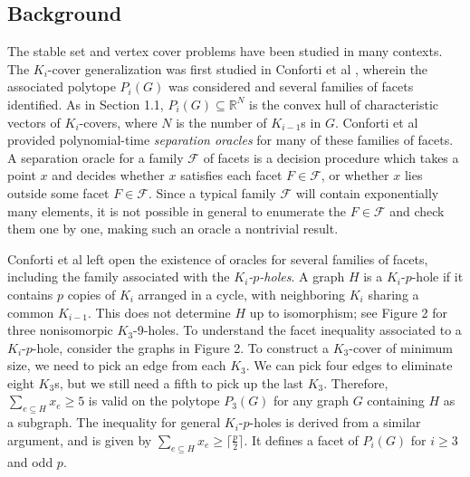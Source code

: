 \subsection{Background}

The stable set and vertex cover problems have been studied in many contexts. 
The $K_i$-cover generalization was first studied in Conforti et al \cite{conforti}, wherein the associated polytope $P_i(G)$ was considered and several families of facets identified. 
As in Section 1.1, $P_i(G) \subseteq \mathbb{R}^N$ is the convex hull of characteristic vectors of $K_i$-covers, where $N$ is the number of $K_{i-1}$s in $G$. 
Conforti et al provided polynomial-time {\em separation oracles} for many of these families of facets. 
A separation oracle for a family $\mathcal{F}$ of facets is a decision procedure which takes a point $x$ and decides whether $x$ satisfies each facet $F \in \mathcal{F}$, or whether $x$ lies outside some facet $F \in \mathcal{F}$.
Since a typical family $\mathcal{F}$ will contain exponentially many elements, it is not possible in general to enumerate the $F \in \mathcal{F}$ and check them one by one, making such an oracle a nontrivial result.

Conforti et al left open the existence of oracles for several families of facets, including the family associated with the {\em $K_i$-$p$-holes}. 
A graph $H$ is a $K_i$-$p$-hole if it contains $p$ copies of $K_i$ arranged in a cycle, with neighboring $K_i$ sharing a common $K_{i-1}$. 
This does not determine $H$ up to isomorphism; see Figure 2 for three nonisomorpic $K_3$-9-holes.
To understand the facet inequality associated to a $K_i$-$p$-hole, consider the graphs in Figure 2. 
To construct a $K_3$-cover of minimum size, we need to pick an edge from each $K_3$. 
We can pick four edges to eliminate eight $K_3$s, but we still need a fifth to pick up the last $K_3$. 
Therefore, $\sum_{e \subseteq H} x_e \ge 5$ is valid on the polytope $P_3(G)$ for any graph $G$ containing $H$ as a subgraph. 
The inequality for general $K_i$-$p$-holes is derived from a similar argument, and is given by $\sum_{e \subseteq H} x_e \ge \lceil \frac{p}{2} \rceil$.
It defines a facet of $P_i(G)$ for $i \ge 3$ and odd $p$.

